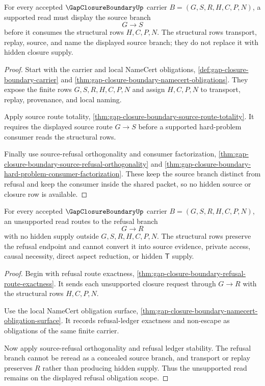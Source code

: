 \begin{theorem}
\label{thm:gap-closure-boundary-source-obligation-scope}
For every accepted $\GapClosureBoundaryUp$ carrier $B=(G,S,R,H,C,P,N)$, a supported read must display the source branch
$$
G \longrightarrow S
$$
before it consumes the structural rows $H,C,P,N$. The structural rows transport, replay, source, and name the displayed source branch; they do not replace it with hidden closure supply.
\end{theorem}
\begin{proof}
Start with the carrier and local NameCert obligations, \autoref{def:gap-closure-boundary-carrier} and \autoref{thm:gap-closure-boundary-namecert-obligations}. They expose the finite rows $G,S,R,H,C,P,N$ and assign $H,C,P,N$ to transport, replay, provenance, and local naming.

Apply source route totality, \autoref{thm:gap-closure-boundary-source-route-totality}. It requires the displayed source route $G \longrightarrow S$ before a supported hard-problem consumer reads the structural rows.

Finally use source-refusal orthogonality and consumer factorization, \autoref{thm:gap-closure-boundary-source-refusal-orthogonality} and \autoref{thm:gap-closure-boundary-hard-problem-consumer-factorization}. These keep the source branch distinct from refusal and keep the consumer inside the shared packet, so no hidden source or closure row is available.
\end{proof}

\begin{theorem}
\label{thm:gap-closure-boundary-refusal-obligation-scope}
For every accepted $\GapClosureBoundaryUp$ carrier $B=(G,S,R,H,C,P,N)$, an unsupported read routes to the refusal branch
$$
G \longrightarrow R
$$
with no hidden supply outside $G,S,R,H,C,P,N$. The structural rows preserve the refusal endpoint and cannot convert it into source evidence, private access, causal necessity, direct aspect reduction, or hidden $\mathsf{T}$ supply.
\end{theorem}
\begin{proof}
Begin with refusal route exactness, \autoref{thm:gap-closure-boundary-refusal-route-exactness}. It sends each unsupported closure request through $G \longrightarrow R$ with the structural rows $H,C,P,N$.

Use the local NameCert obligation surface, \autoref{thm:gap-closure-boundary-namecert-obligation-surface}. It records refusal-ledger exactness and non-escape as obligations of the same finite carrier.

Now apply source-refusal orthogonality and refusal ledger stability. The refusal branch cannot be reread as a concealed source branch, and transport or replay preserves $R$ rather than producing hidden supply. Thus the unsupported read remains on the displayed refusal obligation scope.
\end{proof}

